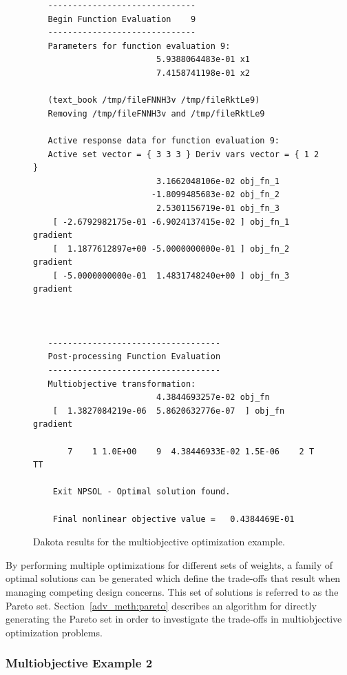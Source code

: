 \begin{figure}
\centering
\begin{bigbox}
\begin{small}
\begin{verbatim}
   ------------------------------
   Begin Function Evaluation    9
   ------------------------------
   Parameters for function evaluation 9:
                         5.9388064483e-01 x1
                         7.4158741198e-01 x2

   (text_book /tmp/fileFNNH3v /tmp/fileRktLe9)
   Removing /tmp/fileFNNH3v and /tmp/fileRktLe9

   Active response data for function evaluation 9:
   Active set vector = { 3 3 3 } Deriv vars vector = { 1 2 }
                         3.1662048106e-02 obj_fn_1
                        -1.8099485683e-02 obj_fn_2
                         2.5301156719e-01 obj_fn_3
    [ -2.6792982175e-01 -6.9024137415e-02 ] obj_fn_1 gradient
    [  1.1877612897e+00 -5.0000000000e-01 ] obj_fn_2 gradient
    [ -5.0000000000e-01  1.4831748240e+00 ] obj_fn_3 gradient



   -----------------------------------
   Post-processing Function Evaluation
   -----------------------------------
   Multiobjective transformation:
                         4.3844693257e-02 obj_fn
    [  1.3827084219e-06  5.8620632776e-07  ] obj_fn gradient

       7    1 1.0E+00    9  4.38446933E-02 1.5E-06    2 T TT     

    Exit NPSOL - Optimal solution found.

    Final nonlinear objective value =   0.4384469E-01
\end{verbatim}
\end{small}
\end{bigbox}
\caption{Dakota results for the multiobjective optimization example.}
\label{opt:additional:multiobjective:example1:figure02}
\end{figure}

By performing multiple optimizations for different sets of weights, a
family of optimal solutions can be generated which define the
trade-offs that result when managing competing design concerns. This
set of solutions is referred to as the Pareto set.
Section~\ref{adv_meth:pareto} describes an algorithm for
directly generating the Pareto set in order to investigate the
trade-offs in multiobjective optimization problems.

\subsubsection{Multiobjective Example 2}
\label{opt:additional:multiobjective:example2}

